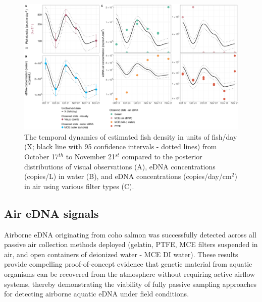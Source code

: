 \documentclass{article}
\begin{document}
\begin{figure}[tbhp] 
\centering
\includegraphics[width=16.5cm]{Plots/Figure_1.jpg}  
\caption{The temporal dynamics of estimated fish density in units of fish/day (X; black line with 95 confidence intervals - dotted lines) from October 17$^{th}$ to November 21$^{st}$ compared to the posterior distributions of visual observations (A), eDNA concentrations (copies/L) in water (B), and eDNA concentrations (copies/day/cm$^2$) in air using various filter types (C).}
\label{fig:fig1}
\end{figure}


\subsection{Air eDNA signals}
Airborne eDNA originating from coho salmon was successfully detected across all passive air collection methods deployed (gelatin, PTFE, MCE filters suspended in air, and open containers of deionized water - MCE DI water). These results provide compelling proof-of-concept evidence that genetic material from aquatic organisms can be recovered from the atmosphere without requiring active airflow systems, thereby demonstrating the viability of fully passive sampling approaches for detecting airborne aquatic eDNA under field conditions.

\end{document}
